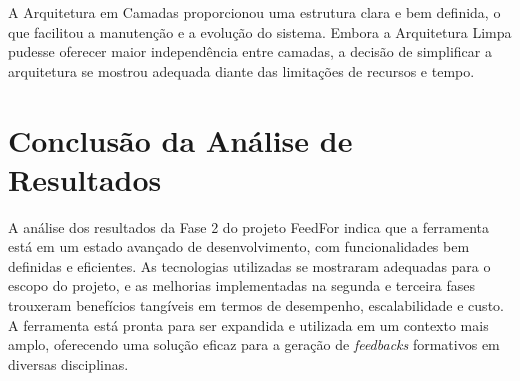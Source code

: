 A Arquitetura em Camadas proporcionou uma estrutura clara e bem definida, o que facilitou a manutenção e a evolução do sistema. Embora a Arquitetura Limpa pudesse oferecer maior independência entre camadas, a decisão de simplificar a arquitetura se mostrou adequada diante das limitações de recursos e tempo.

\section{Conclusão da Análise de Resultados}

A análise dos resultados da Fase 2 do projeto FeedFor indica que a ferramenta está em um estado avançado de desenvolvimento, com funcionalidades bem definidas e eficientes. As tecnologias utilizadas se mostraram adequadas para o escopo do projeto, e as melhorias implementadas na segunda e terceira fases trouxeram benefícios tangíveis em termos de desempenho, escalabilidade e custo. A ferramenta está pronta para ser expandida e utilizada em um contexto mais amplo, oferecendo uma solução eficaz para a geração de \textit{feedbacks} formativos em diversas disciplinas.
